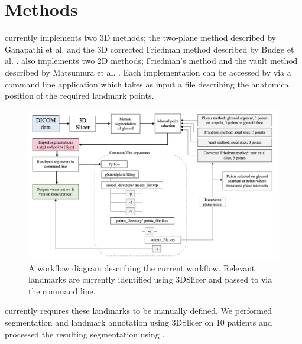 \section{Methods}
\label{sec:methods}
\sksglenoid currently implements two 3D methods; the two-plane method described by Ganapathi et al. \cite{PMID:20933439} and the 3D corrected 
Friedman method described by Budge et al. \cite{BUDGE2011577}. \sksglenoid also implements two
2D methods; Friedman's method \cite{PMID:1522089} and the vault method described by Matsumura et al. \cite{PMID:24618285}. Each implementation can be accessed by via a command line application which takes as 
input a file describing the anatomical position of the required landmark points.

\begin{figure}
        \begin{center}
                \includegraphics[width=0.85\linewidth]{figures/workflow.png}
                        \caption{\label{fig:workflow}A workflow diagram describing the current workflow. Relevant landmarks 
			are currently identified using 3DSlicer and passed to \sksglenoid via the command line.}
        \end{center}
\end{figure}

\sksglenoid currently requires these landmarks to be manually defined. We performed segmentation 
and landmark annotation using 3DSlicer \cite{Kikinis2014} on 10 patients and processed
the resulting 
segmentation using \sksglenoidns.

